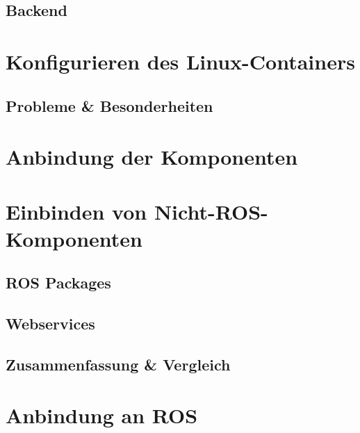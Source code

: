 \subsection{Backend}


\section{Konfigurieren des Linux-Containers}



\subsection{Probleme \& Besonderheiten}


\section{Anbindung der Komponenten}




\section{Einbinden von Nicht-ROS-Komponenten}


\subsection{ROS Packages}


\subsection{Webservices}




\subsection{Zusammenfassung \& Vergleich}


\section{Anbindung an ROS}
